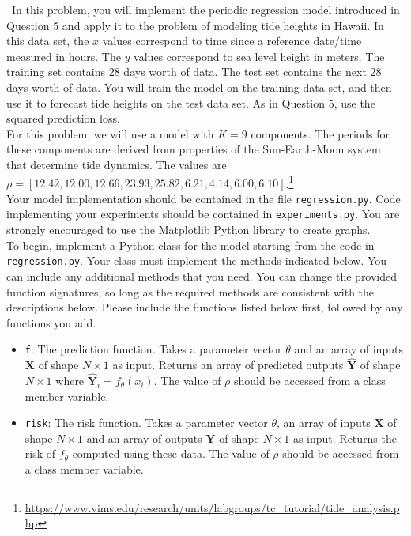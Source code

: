 \documentclass[11pt]{article}
\newcommand{\mbf}[1]{{\mathbf{#1}}}
\begin{document}
\begin{problem}{50} ~In this problem, you will implement the periodic regression model introduced in Question 5 and apply it to the problem of modeling tide heights in Hawaii. In this data set, the $x$ values correspond to time since a reference date/time measured in hours. The $y$ values correspond to sea level height in meters. The training set contains 28 days worth of data. The test set contains the next 28 days worth of data. You will train the model on the training data set, and then use it to forecast tide heights on the test data set. As in Question 5, use the squared prediction loss. \\

For this problem, we will use a model with $K=9$ components. The periods for these components are derived from properties of the Sun-Earth-Moon system that determine tide dynamics. The values are $\rho=[12.42, 12.00, 12.66, 23.93, 25.82, 6.21, 4.14, 6.00, 6.10]$.\footnote{\url{https://www.vims.edu/research/units/labgroups/tc_tutorial/tide_analysis.php}}\\

Your model implementation should be contained in the file \verb|regression.py|. Code implementing your experiments should be contained in  \verb|experiments.py|. You are strongly encouraged to use the Matplotlib Python library to create graphs. \\
    
To begin, implement a Python class for the model starting from the code in \verb|regression.py|. Your class must implement the methods indicated below. You can include any additional methods that you need. You can change the provided function signatures, so long as the required methods are consistent with the descriptions below. Please include the functions listed below first, followed by any functions you add. 
    
\begin{itemize}
        \item \verb|f|: The prediction function. Takes a parameter vector $\theta$ and an array of inputs $\mbf{X}$ of shape $N\times 1$ as input. Returns an array of predicted outputs $\hat{\mbf{Y}}$ of shape $N\times 1$ where $\hat{\mbf{Y}}_i=f_{\theta}(x_i)$. The value of $\rho$ should be accessed from a class member variable. 
        
        \item \verb|risk|: The risk function. Takes a parameter vector $\theta$, an array of inputs $\mbf{X}$ of shape $N\times 1$ and an array of outputs $\mbf{Y}$ of shape $N\times 1$ as input. Returns the risk of $f_{\theta}$ computed using these data. The value of $\rho$ should be accessed from a class member variable.
        

\end{itemize}
\end{problem}
\end{document}
